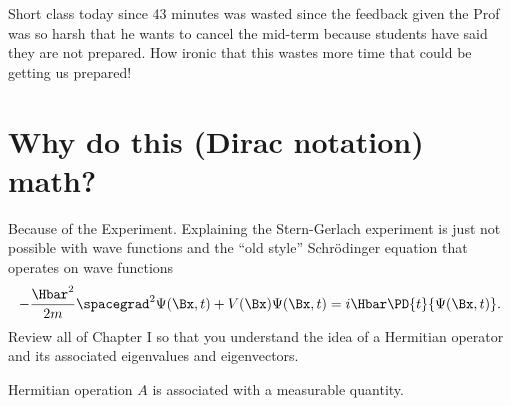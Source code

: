 %
%

Short class today since 43 minutes was wasted since the feedback given the Prof was so harsh that he wants to cancel the mid-term because students have said they are not prepared.  How ironic that this wastes more time that could be getting us prepared!

\section{Why do this (Dirac notation) math?}

Because of the  Experiment.  Explaining the Stern-Gerlach experiment is just not possible with wave functions and the ``old style'' Schr\"{o}dinger equation that operates on wave functions
%
\begin{equation}\label{eqn:PHY356Foct26:100}
\begin{aligned}
- \frac{\Hbar^2}{2m} \spacegrad^2 \Psi(\Bx,t) + V(\Bx) \Psi(\Bx,t) = i \Hbar \PD{t}{\Psi(\Bx,t)}.
\end{aligned}
\end{equation}
%
Review all of Chapter I so that you understand the idea of a Hermitian operator and its associated eigenvalues and eigenvectors.

Hermitian operation \(A\) is associated with a measurable quantity.


